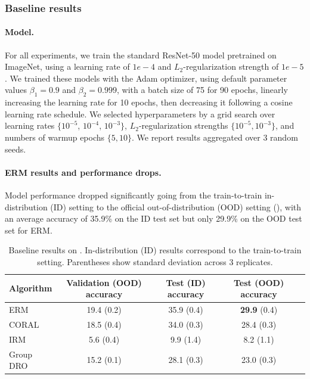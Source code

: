 \subsubsection{Baseline results}

\paragraph{Model.} For all experiments, we train the standard ResNet-50 model
\citep{he2016resnet} pretrained on ImageNet, using a learning rate of $1e-4$ and
$L_2$-regularization strength of $1e-5$. We trained these models with the Adam
optimizer, using default parameter values $\beta_{1} = 0.9$ and $\beta_{2} =
0.999$, with a batch size of 75 for 90 epochs, linearly increasing the learning
rate for 10 epochs, then decreasing it following a cosine learning rate schedule.
We selected hyperparameters by a grid search over learning rates $\{10^{-5}$, $10^{-4}$, $10^{-3}\}$, $L_2$-regularization strengths $\{10^{-5}, 10^{-3}\}$,
and numbers of warmup epochs $\{5, 10\}$.
We report results aggregated over 3 random seeds.

\paragraph{ERM results and performance drops.}
Model performance dropped significantly going from the train-to-train in-distribution (ID) setting to
the official out-of-distribution (OOD) setting (),
with an average accuracy of 35.9\% on the ID test set but only 29.9\% on the OOD test set for ERM.
\begin{table}[t!]
  \caption{Baseline results on \RxRx. In-distribution (ID) results correspond to the train-to-train setting. Parentheses show standard deviation across
  3 replicates.}
  \label{tab:results_rxrx1}
  \centering
  \begin{tabular}{lcccc}
  \toprule
  Algorithm & Validation (OOD) accuracy & Test (ID) accuracy & Test (OOD) accuracy\\
  \midrule
  ERM       & 19.4 (0.2) & 35.9 (0.4) & \textbf{29.9} (0.4) \\
  CORAL     & 18.5 (0.4) & 34.0 (0.3) & 28.4 (0.3) \\
  IRM       & 5.6 (0.4) & 9.9 (1.4) & 8.2 (1.1) \\
  Group DRO & 15.2 (0.1) & 28.1 (0.3) & 23.0 (0.3) \\
  \bottomrule
  \end{tabular}
\end{table}

